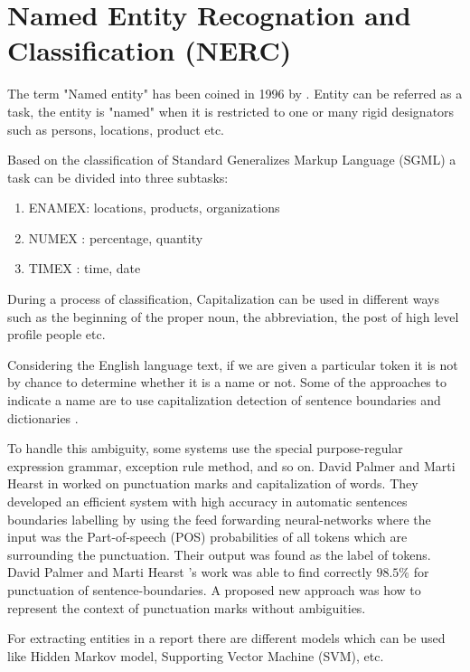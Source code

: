 \section{ Named Entity Recognation and Classification   (NERC)}

The term "Named entity" has been coined in 1996 by  \citep{grishman1996design}.
Entity can be referred as a task, the entity is "named" when it is restricted to one or many rigid designators \citep{sharnagat2014named} such as persons, locations, product etc.

Based on the classification of Standard Generalizes Markup Language (SGML) a task can be divided into three subtasks:
\begin{enumerate}
\item ENAMEX: locations, products, organizations
\item NUMEX : percentage, quantity
\item TIMEX : time, date
\end{enumerate}
During a process of classification, Capitalization can be used in different ways such as the beginning of the proper noun, the abbreviation, the post of high level profile people etc.

Considering the English language text, if we are given a  particular token it is not by chance  to  determine whether it is a name or not. Some of the approaches to indicate a name are to  use capitalization  detection of sentence boundaries and dictionaries \citep{baluja2000applying}.

To handle this ambiguity, some systems use the special purpose-regular expression grammar, exception rule method, and so on.  David Palmer and Marti Hearst in  \citep{palmer1994adaptive} worked on punctuation marks and capitalization of words. They developed an efficient system with high accuracy in automatic sentences boundaries labelling   by using the feed forwarding neural-networks where the input was the Part-of-speech (POS) probabilities of all tokens which are surrounding the punctuation. Their output was found as the label of tokens.  David Palmer and Marti Hearst 's work was able to find correctly $98.5\%$ for punctuation of  sentence-boundaries. A proposed  new approach was how to represent the context of punctuation marks without ambiguities.

For extracting entities in a report there are different models which can be used like Hidden Markov model, Supporting Vector Machine (SVM), etc.

